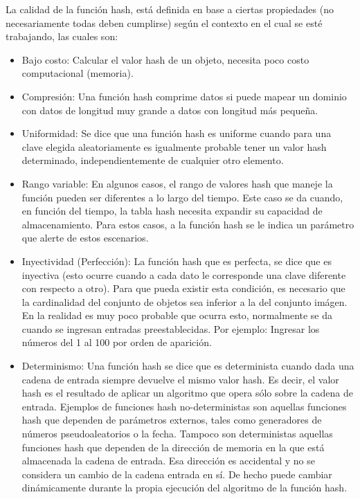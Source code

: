 \documentclass[letterpaper,openright,12pt]{report}
\begin{document}
La calidad de la función hash, está definida en base a ciertas propiedades (no necesariamente todas deben cumplirse) según el contexto en el cual se esté trabajando, las cuales son:
\begin{itemize}
\itemsep1pt\parskip0pt
\item
  Bajo costo: Calcular el valor hash de un objeto, necesita poco costo computacional (memoria).
\item
  Compresión: Una función hash comprime datos si puede mapear un dominio con datos de longitud muy grande a datos con longitud más pequeña.
\item
  Uniformidad: Se dice que una función hash es uniforme cuando para una clave elegida aleatoriamente es igualmente probable tener un valor hash determinado, independientemente de cualquier otro elemento.
\newpage
\item
  Rango variable: En algunos casos, el rango de valores hash que maneje la función pueden ser diferentes a lo largo del tiempo. Este caso se da cuando, en función del tiempo, la tabla hash necesita expandir su capacidad de almacenamiento. Para estos casos, a la función hash se le indica un parámetro que alerte de estos escenarios.
\item
  Inyectividad (Perfección): La función hash que es perfecta, se dice que es inyectiva (esto ocurre cuando a cada dato le corresponde una clave diferente con respecto a otro). Para que pueda existir esta condición, es necesario que la cardinalidad del conjunto de objetos sea inferior a la del conjunto imágen. En la realidad es muy poco probable que ocurra esto, normalmente se da cuando se ingresan entradas preestablecidas. Por ejemplo: Ingresar los números del 1 al 100 por orden de aparición.
\item
  Determinismo: Una función hash se dice que es determinista cuando dada una cadena de entrada siempre devuelve el mismo valor hash. Es decir, el valor hash es el resultado de aplicar un algoritmo que opera sólo sobre la cadena de entrada. Ejemplos de funciones hash no-deterministas son aquellas funciones hash que dependen de parámetros externos, tales como generadores de números pseudoaleatorios o la fecha. Tampoco son deterministas aquellas funciones hash que dependen de la dirección de memoria en la que está almacenada la cadena de entrada. Esa dirección es accidental y no se considera un cambio de la cadena entrada en sí. De hecho puede cambiar dinámicamente durante la propia ejecución del algoritmo de la función hash.
\end{itemize}
\newpage
\end{document}
